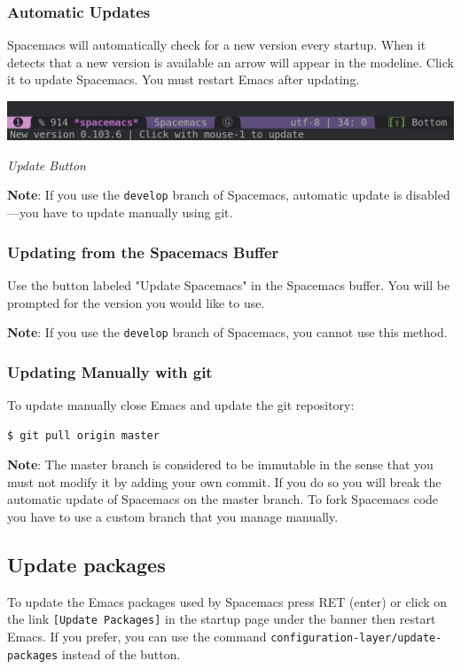 \documentclass[11pt]{article}
\begin{document}
\subsubsection{Automatic Updates}
\label{sec:org63c649f}
Spacemacs will automatically check for a new version every startup. When it
detects that a new version is available an arrow will appear in the modeline.
Click it to update Spacemacs. You must restart Emacs after updating.
\begin{center}
\includegraphics[width=.9\linewidth]{img/powerline-update.png}
\end{center}
\emph{Update Button}

\textbf{Note}: If you use the \texttt{develop} branch of Spacemacs, automatic update is
disabled---you have to update manually using git.

\subsubsection{Updating from the Spacemacs Buffer}
\label{sec:orgb2e603f}
Use the button labeled "Update Spacemacs" in the Spacemacs buffer. You will be
prompted for the version you would like to use.

\textbf{Note}: If you use the \texttt{develop} branch of Spacemacs, you cannot use this method.

\subsubsection{Updating Manually with git}
\label{sec:org40264be}
To update manually close Emacs and update the git repository:

\begin{verbatim}
$ git pull origin master
\end{verbatim}

\textbf{Note}: The master branch is considered to be immutable in the sense that you
must not modify it by adding your own commit. If you do so you will break the
automatic update of Spacemacs on the master branch. To fork Spacemacs code you
have to use a custom branch that you manage manually.

\subsection{Update packages}
\label{sec:org23706c6}
To update the Emacs packages used by Spacemacs press RET (enter) or click on the
link \texttt{[Update Packages]} in the startup page under the banner then restart
Emacs. If you prefer, you can use the command
\texttt{configuration-layer/update-packages} instead of the button.
\end{document}

